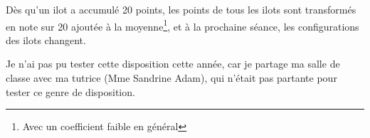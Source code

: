 Dès qu'un ilot a accumulé 20 points, les points de tous les ilots sont transformés
en note sur 20 ajoutée à la moyenne\footnote{Avec un coefficient faible en général},
et à la prochaine séance, les configurations des ilots changent.

Je n'ai pas pu tester cette disposition cette année, car je partage ma salle de classe
avec ma tutrice (Mme Sandrine Adam), qui n'était pas partante pour tester ce genre de disposition.

